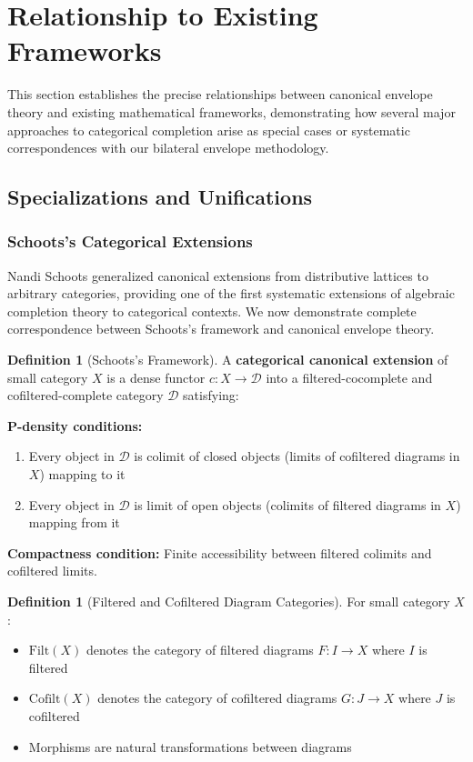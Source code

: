 \documentclass[11pt]{article}
\theoremstyle{plain}
\theoremstyle{definition}
\newtheorem{definition}[theorem]{Definition}
\theoremstyle{remark}
\begin{document}
\section{Relationship to Existing Frameworks}

This section establishes the precise relationships between canonical envelope theory and existing mathematical frameworks, demonstrating how several major approaches to categorical completion arise as special cases or systematic correspondences with our bilateral envelope methodology.

\subsection{Specializations and Unifications}

\subsubsection{Schoots's Categorical Extensions}

Nandi Schoots \cite{schoots2015generalising} generalized canonical extensions from distributive lattices to arbitrary categories, providing one of the first systematic extensions of algebraic completion theory to categorical contexts. We now demonstrate complete correspondence between Schoots's framework and canonical envelope theory.

\begin{definition}[Schoots's Framework]
A \textbf{categorical canonical extension} of small category $X$ is a dense functor $c : X \to \mathcal{D}$ into a filtered-cocomplete and cofiltered-complete category $\mathcal{D}$ satisfying:

\textbf{P-density conditions:}
\begin{enumerate}
\item Every object in $\mathcal{D}$ is colimit of closed objects (limits of cofiltered diagrams in $X$) mapping to it
\item Every object in $\mathcal{D}$ is limit of open objects (colimits of filtered diagrams in $X$) mapping from it
\end{enumerate}

\textbf{Compactness condition:} Finite accessibility between filtered colimits and cofiltered limits.
\end{definition}

\begin{definition}[Filtered and Cofiltered Diagram Categories]
For small category $X$:
\begin{itemize}
\item $\mathrm{Filt}(X)$ denotes the category of filtered diagrams $F : I \to X$ where $I$ is filtered
\item $\mathrm{Cofilt}(X)$ denotes the category of cofiltered diagrams $G : J \to X$ where $J$ is cofiltered
\item Morphisms are natural transformations between diagrams
\end{itemize}
\end{definition}
\end{document}
